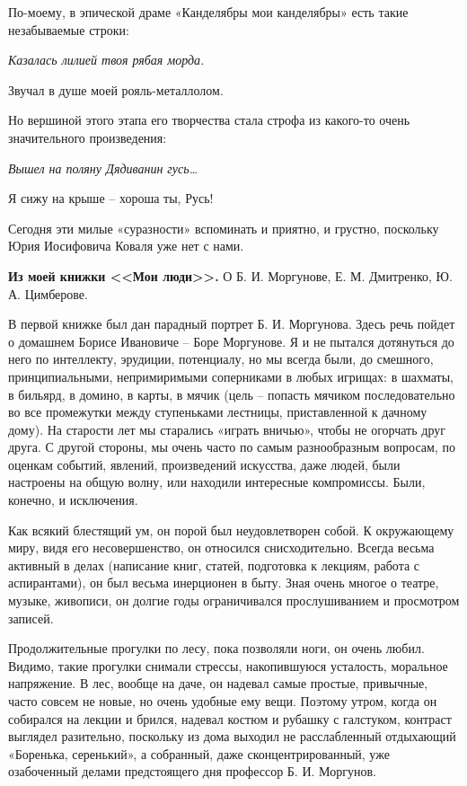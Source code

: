 \noindent
По-моему, в эпической драме «Канделябры мои канделябры» есть такие незабываемые строки:

\vspace{10pt}

{\itshape
Казалась лилией твоя рябая морда.

Звучал в душе моей рояль-металлолом.
}

\indent

\noindent
Но вершиной этого этапа его творчества стала строфа из какого-то очень значительного произведения:

\indent

{\itshape
	Вышел на поляну Дядиванин гусь…
	
	Я сижу на крыше – хороша ты, Русь!
}

\indent

Сегодня эти милые «суразности» вспоминать и приятно, и грустно, поскольку Юрия Иосифовича Коваля уже нет с нами.

\indent

\textbf{Из моей книжки <<Мои люди>>.} О Б. И. Моргунове, Е. М. Дмитренко, Ю. А. Цимберове.

В первой книжке был дан парадный портрет Б. И. Моргунова. Здесь речь пойдет о домашнем Борисе Ивановиче – Боре Моргунове. Я и не пытался дотянуться до него по интеллекту, эрудиции, потенциалу, но мы всегда были, до смешного, принципиальными, непримиримыми соперниками в любых игрищах: в шахматы, в бильярд, в домино, в карты, в мячик (цель – попасть мячиком последовательно во все промежутки между ступеньками лестницы, приставленной к дачному дому). На старости лет мы старались «играть вничью», чтобы не огорчать друг друга. С другой стороны, мы очень часто по самым разнообразным вопросам, по оценкам событий, явлений, произведений искусства, даже людей, были настроены на общую волну, или находили интересные компромиссы. Были, конечно, и исключения. 
	
	Как всякий блестящий ум, он порой был неудовлетворен собой. К окружающему миру, видя его несовершенство, он относился снисходительно. Всегда весьма активный в делах (написание книг, статей, подготовка к лекциям, работа с аспирантами), он был весьма инерционен в быту. Зная очень многое о театре, музыке, живописи, он долгие годы ограничивался прослушиванием и просмотром записей. 
	
	Продолжительные прогулки по лесу, пока позволяли ноги, он очень любил. Видимо, такие прогулки снимали стрессы, накопившуюся усталость, моральное напряжение. В лес, вообще на даче, он надевал самые простые, привычные, часто совсем не новые, но очень удобные ему вещи. Поэтому утром, когда он собирался на лекции и брился, надевал костюм и рубашку с галстуком, контраст выглядел разительно, поскольку из дома выходил не расслабленный отдыхающий «Боренька, серенький», а собранный, даже сконцентрированный, уже озабоченный делами предстоящего дня профессор Б. И. Моргунов.
	
